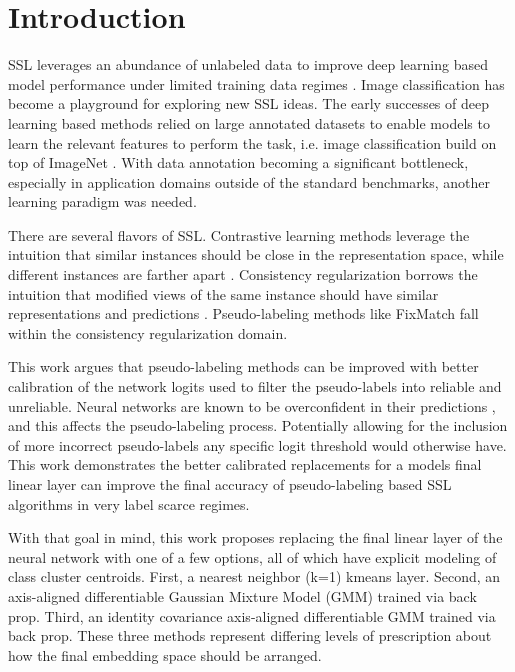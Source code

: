 \documentclass[10pt,twocolumn,letterpaper]{article}
\begin{document}
\section{Introduction}
SSL leverages an abundance of unlabeled data to improve deep learning based model performance under limited training data regimes \cite{zhu2022introduction,li2019safe,hady2013semi}.
Image classification has become a playground for exploring new SSL ideas.
The early successes of deep learning based methods relied on large annotated datasets to enable models to learn the relevant features to perform the task, i.e. image classification build on top of ImageNet \cite{deng2009imagenet}.
With data annotation becoming a significant bottleneck, especially in application domains outside of the standard benchmarks, another learning paradigm was needed.

There are several flavors of SSL.
Contrastive learning methods leverage the intuition that similar instances should be close in the representation space, while different instances are farther apart \cite{yang2022class,li2021comatch}.
Consistency regularization borrows the intuition that modified views of the same instance should have similar representations and predictions \cite{sohn2020fixmatch,lee2022contrastive,zhang2021flexmatch,kim2022conmatch}.
Pseudo-labeling methods like FixMatch \cite{sohn2020fixmatch} fall within the consistency regularization domain.

This work argues that pseudo-labeling methods can be improved with better calibration of the network logits used to filter the pseudo-labels into reliable and unreliable. 
Neural networks are known to be overconfident in their predictions \cite{wei2022mitigating}, and this affects the pseudo-labeling process. 
Potentially allowing for the inclusion of more incorrect pseudo-labels any specific logit threshold would otherwise have.
This work demonstrates the better calibrated replacements for a models final linear layer can improve the final accuracy of pseudo-labeling based SSL algorithms in very label scarce regimes. 

With that goal in mind, this work proposes replacing the final linear layer of the neural network with one of a few options, all of which have explicit modeling of class cluster centroids.
First, a nearest neighbor (k=1) kmeans layer.
Second, an axis-aligned  differentiable Gaussian Mixture Model (GMM) trained via back prop.
Third, an identity covariance axis-aligned differentiable GMM trained via back prop. 
These three methods represent differing levels of prescription about how the final embedding space should be arranged. 
\end{document}
